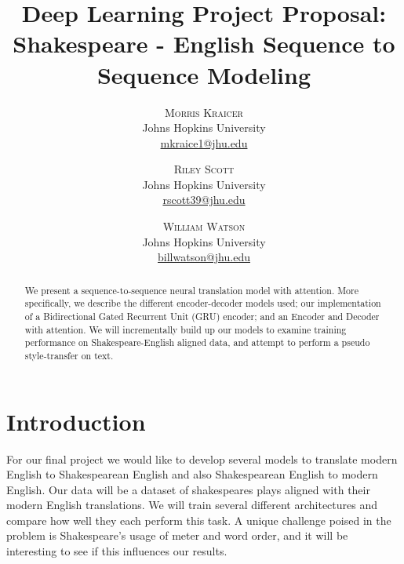 \documentclass[twoside,twocolumn]{article}
\title{Deep Learning Project Proposal:\\Shakespeare - English Sequence to Sequence Modeling}
\author{%
\textsc{Morris Kraicer} \\[1ex]
\normalsize Johns Hopkins University \\
\normalsize \href{mailto:mkraice1@jhu.edu}{mkraice1@jhu.edu}
 \and
 \textsc{Riley Scott} \\[1ex]
\normalsize Johns Hopkins University \\
\normalsize \href{mailto:rscott39@jhu.edu}{rscott39@jhu.edu}
 \and
  \textsc{William Watson} \\[1ex]
\normalsize Johns Hopkins University \\
\normalsize \href{mailto:billwatson@jhu.edu}{billwatson@jhu.edu}
}
\date{}%
\begin{document}
\maketitle













\begin{abstract}
\noindent
We present a sequence-to-sequence neural translation model with attention. More specifically, we describe the different encoder-decoder models used; our implementation of a Bidirectional Gated Recurrent Unit (GRU) encoder; and an Encoder and Decoder with attention. We will incrementally build up our models to examine training performance on Shakespeare-English aligned data, and attempt to perform a pseudo style-transfer on text.
\end{abstract}

\section{Introduction}
For our final project we would like to develop several models to translate modern English to Shakespearean English and also Shakespearean English to modern English. Our data will be a dataset of shakespeares plays aligned with their modern English translations. We will train several different architectures and compare how well they each perform this task. A unique challenge poised in the problem is Shakespeare's usage of meter and word order, and it will be interesting to see if this influences our results.
\end{document}
